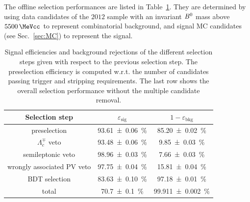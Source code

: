 The offline selection performances are listed in Table~\ref{tab:offlineselperformance}.
They are determined by using data candidates of the $\num{2012}$ sample with an
invariant $B^0$ mass above $\SI{5500}{\MeVcc}$ to represent combinatorial
background, and signal MC candidates (see Sec.~\ref{sec:MC}) to represent the signal.
%

%
\begin{table}[t]
	\centering
	\caption{Signal efficiencies and
	background rejections of the different selection steps given with
	respect to the previous selection step. The preselection efficiency is computed  w.r.t. the number of candidates passing trigger and stripping requirements.
	The last row shows the overall
	selection performance without the multiple candidate removal.}
	\begin{tabular}{ccc}
		\toprule
		Selection step & $\varepsilon_\text{sig}$ & $1-\varepsilon_\text{bkg}$ \\
		\midrule
		preselection & \SI{93.61\pm0.06}{\percent} & \SI{85.20\pm0.02}{\percent} \\
		$\Lambda_c^\mp$ veto & \SI{93.48\pm0.06}{\percent} & \SI{9.85\pm0.03}{\percent} \\
		semileptonic veto & \SI{98.96\pm0.03}{\percent} & \SI{7.66\pm0.03}{\percent}\\
		wrongly associated PV veto & \SI{97.75\pm0.04}{\percent} & \SI{15.81\pm0.04}{\percent}\\
		BDT selection & \SI{83.63\pm0.10}{\percent} & \SI{97.18\pm0.01}{\percent}\\
		\midrule
		total & \SI{70.7\pm0.1}{\percent} & \SI{99.911\pm0.002}{\percent}\\
		\bottomrule
	\end{tabular}
	\label{tab:offlineselperformance}
\end{table}
